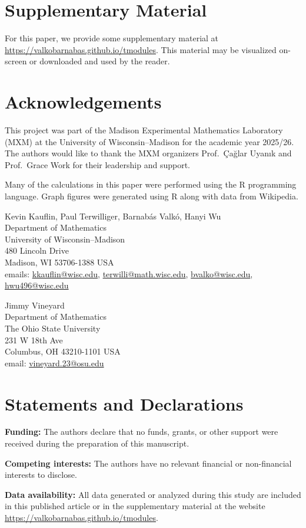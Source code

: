 \documentclass[12pt,letterpaper]{article}
\begin{document}
\section{Supplementary Material}

For this paper, we provide some supplementary material at \url{https://valkobarnabas.github.io/tmodules}. This material may be visualized on-screen or downloaded and used by the reader.

\section{Acknowledgements} 

This project was part of the Madison Experimental Mathematics Laboratory (MXM) at the University of Wisconsin--Madison for the academic year 2025/26. The authors would like to thank the MXM organizers Prof.\ Ça\u{g}lar Uyan{\i}k and Prof.\ Grace Work for their leadership and support.

Many of the calculations in this paper were performed using the R programming language. Graph figures were generated using R along with data from Wikipedia.

\printbibliography
\vspace{10pt}

\noindent
Kevin Kauflin, Paul Terwilliger, Barnab\'as Valk\'o, Hanyi Wu\\
Department of Mathematics\\
University of Wisconsin--Madison\\
480 Lincoln Drive\\
Madison, WI 53706-1388 USA\\
emails: \url{kkauflin@wisc.edu}, \url{terwilli@math.wisc.edu}, \url{bvalko@wisc.edu}, \url{hwu496@wisc.edu}


\noindent
Jimmy Vineyard\\
Department of Mathematics\\
The Ohio State University\\
231 W 18th Ave\\
Columbus, OH 43210-1101 USA\\
email: \url{vineyard.23@osu.edu}

\section{Statements and Declarations}

\textbf{Funding:} The authors declare that no funds, grants, or other support were received during
the preparation of this manuscript.

\textbf{Competing interests:} The authors have no relevant financial or non-financial interests to
disclose.

\textbf{Data availability:} All data generated or analyzed during this study are included in this
published article or in the supplementary material at the website \url{https://valkobarnabas.github.io/tmodules}.
\end{document}
